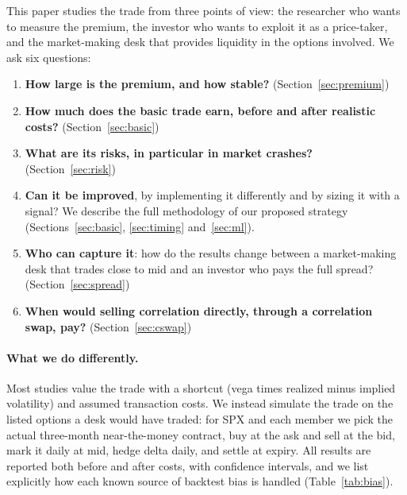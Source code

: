 This paper studies the trade from three points of view: the researcher who wants to measure the premium, the investor who wants to exploit it as a price-taker, and the market-making desk that provides liquidity in the options involved. We ask six questions:
\begin{enumerate}
  \item \textbf{How large is the premium, and how stable?} (Section~\ref{sec:premium})
  \item \textbf{How much does the basic trade earn, before and after realistic costs?} (Section~\ref{sec:basic})
  \item \textbf{What are its risks, in particular in market crashes?} (Section~\ref{sec:risk})
  \item \textbf{Can it be improved}, by implementing it differently and by sizing it with a signal? We describe the full methodology of our proposed strategy (Sections~\ref{sec:basic}, \ref{sec:timing} and~\ref{sec:ml}).
  \item \textbf{Who can capture it}: how do the results change between a market-making desk that trades close to mid and an investor who pays the full spread? (Section~\ref{sec:spread})
  \item \textbf{When would selling correlation directly, through a correlation swap, pay?} (Section~\ref{sec:cswap})
\end{enumerate}

\paragraph{What we do differently.} Most studies value the trade with a shortcut (vega times realized minus implied volatility) and assumed transaction costs. We instead simulate the trade on the listed options a desk would have traded: for SPX and each member we pick the actual three-month near-the-money contract, buy at the ask and sell at the bid, mark it daily at mid, hedge delta daily, and settle at expiry. All results are reported both before and after costs, with confidence intervals, and we list explicitly how each known source of backtest bias is handled (Table~\ref{tab:bias}).

